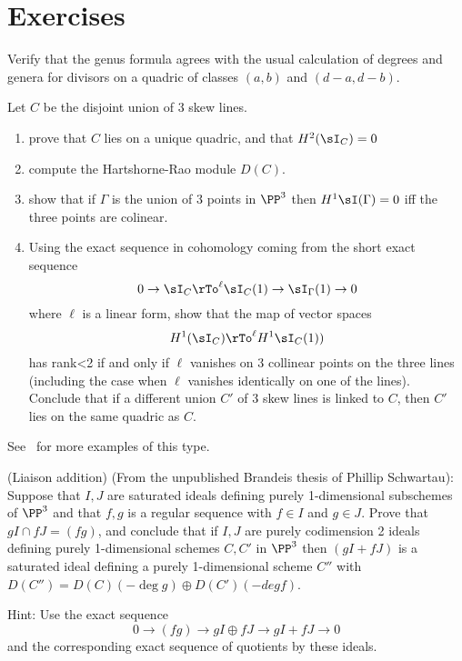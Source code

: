 \section{Exercises}

\begin{exercise}
 Verify that the genus formula agrees with the usual calculation of degrees and genera for divisors on a quadric of
 classes $(a,b)$ and $(d-a, d-b)$.
\end{exercise}

\begin{exercise}
Let $C$ be the disjoint union of 3 skew lines. 
\begin{enumerate}
 \item prove that $C$ lies on a unique quadric, and that $H^2(\sI_C) = 0$
 \item compute the Hartshorne-Rao module $D(C)$.
 \item show that if $\Gamma$ is the union of 3 points in $\PP^3$ then
 $H^1\sI(\Gamma) = 0$ iff the three points are colinear.
 \item Using the exact sequence in cohomology coming from the short exact sequence
$$
0\to \sI_C \rTo^{\ell} \sI_C(1) \to \sI_\Gamma(1) \to 0
$$
where $\ell$ is a linear form, show that the map of vector spaces
$$
H^1(\sI_C) \rTo^{\ell} H^1\sI_C(1))
$$
has rank<2 if and only if $\ell$ vanishes on 3 collinear points on the three lines (including the case when $\ell$ vanishes identically on one of the lines).
Conclude that if a different union $C'$ of 3 skew lines is linked to $C$, then $C'$ lies on the same quadric as $C$.
\end{enumerate}
See~\cite{Migliore} for more examples of this type.
\end{exercise}

\begin{exercise} (Liaison addition)\label{Liaison addition}
(From the unpublished Brandeis thesis of Phillip Schwartau):
Suppose that $I, J$ are saturated ideals defining purely 1-dimensional subschemes of $\PP^3$
and that $f,g$ is a regular sequence with $f\in I$ and $g\in J$.
Prove that $g I \cap fJ = (fg)$, and conclude that if $I,J$ are purely codimension 2 ideals
 defining purely 1-dimensional schemes $C,C'$ in $\PP^3$
 then  $(gI+fJ)$ is a saturated ideal defining a purely 1-dimensional
scheme $C''$ with $D(C'') = D(C)(-\deg g) \oplus D(C')(-deg f)$.

Hint: Use the exact sequence 
$$
0\to (fg) \to gI \oplus fJ \to gI+fJ \to 0
$$
and the corresponding exact sequence of quotients by these ideals.
\end{exercise}


